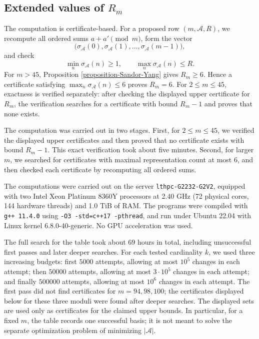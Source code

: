 \documentclass[12pt,a4paper,reqno]{amsart}
\numberwithin{equation}{section}
\newcommand{\card}[1]{\left|#1\right|}
\theoremstyle{plain}
\theoremstyle{definition}
\begin{document}
\subsection{Extended values of \texorpdfstring{$R_m$}{Rm}}
The computation is certificate-based.  For a proposed row
\((m,\mathcal{A},R)\), we recompute all ordered sums \(a+a'\pmod m\), form the vector
\[
\bigl(\sigma_\mathcal{A}(0),\sigma_{\mathcal{A}}(1),\ldots,
\sigma_{\mathcal{A}}(m-1)\bigr),
\]
and check
\[
\min_n \sigma_{\mathcal{A}}(n)\ge 1,\qquad
\max_n \sigma_{\mathcal{A}}(n)\le R.
\]
For \(m>45\), Proposition \ref{proposition-Sandor-Yang} gives \(R_m\ge 6\).  Hence a
certificate satisfying \(\max_n \sigma_{\mathcal{A}}(n)\le 6\) proves \(R_m=6\).
For \(2\le m\le45\), exactness is verified separately: after checking the displayed
upper certificate for \(R_m\), the verification searches for a certificate with bound
\(R_m-1\) and proves that none exists.


The computation was carried out in two stages.  First, for \(2\le m\le45\), we
verified the displayed upper certificates and then proved that no certificate exists
with bound \(R_m-1\).  This exact verification took about five minutes.  Second, for
larger \(m\), we searched for certificates with maximal representation count at most
\(6\), and then checked each certificate by recomputing all ordered sums.  

The computations were carried out on the server \texttt{lthpc-G2232-G2V2}, equipped with two Intel Xeon Platinum 8360Y processors at 2.40 GHz (72 physical cores, 144 hardware threads) and 1.0 TiB of RAM.
The programs were compiled with \texttt{g++ 11.4.0} using
\texttt{-O3 -std=c++17 -pthread}, and run under Ubuntu 22.04 with Linux kernel 6.8.0-40-generic. No GPU acceleration was used.

The full search for the table took about \(69\) hours in total, including unsuccessful
first passes and later deeper searches.  For each tested cardinality \(k\), we used
three increasing budgets: first \(5000\) attempts, allowing at most \(10^5\) changes in
each attempt; then \(50000\) attempts, allowing at most \(3\cdot10^5\) changes in each
attempt; and finally \(500000\) attempts, allowing at most \(10^6\) changes in each
attempt.  The first pass did not find certificates for \(m=94,98,100\); the
certificates displayed below for these three moduli were found after deeper searches.
The displayed sets are used only as certificates for the claimed upper bounds.  In
particular, for a fixed \(m\), the table records one successful basis; it is not meant
to solve the separate optimization problem of minimizing \(\card{\mathcal{A}}\).
\end{document}
